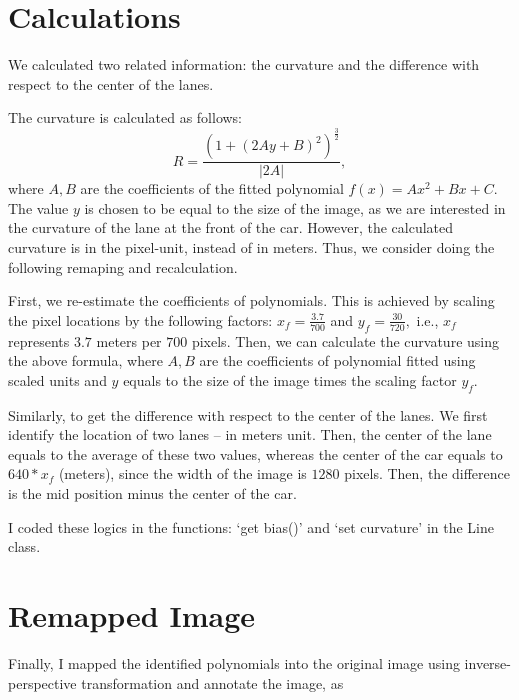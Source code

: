 \documentclass[draftcls,onecolumn,12pt]{IEEEtran}
\theoremstyle{plain}
\theoremstyle{plain}
\begin{document}
\section{Calculations}
We calculated two related information: the curvature and the difference with respect to the center of the lanes.

The curvature is calculated as follows:
\begin{equation}
R = \frac{(1 + (2Ay + B)^2)^{\frac{3}{2}}}{|2A|},
\end{equation}
where $A, B$ are the coefficients of the fitted polynomial $f(x) = Ax^2 + Bx +C.$ The value $y$ is chosen to be equal to the size of the image, as we are interested in the curvature of the lane at the front of the car. However, the calculated curvature is in the pixel-unit, instead of in meters. Thus, we consider doing the following remaping and recalculation.

First, we re-estimate the coefficients of polynomials. This is achieved by scaling the pixel locations by the following factors: $x_f = \frac{3.7}{700}$ and $y_f = \frac{30}{720},$ i.e., $x_f$ represents $3.7$ meters per $700$ pixels. Then, we can calculate the curvature using the above formula, where $A, B$ are the coefficients of polynomial fitted using scaled units and $y$ equals to the size of the image times the scaling factor $y_f.$

Similarly, to get the difference with respect to the center of the lanes. We first identify the location of two lanes -- in meters unit. Then, the center of the lane equals to the average of these two values, whereas the center of the car equals to $640 * x_f$ (meters), since the width of the image is $1280$ pixels. Then, the difference is the mid position minus the center of the car.

I coded these logics in the functions: `get bias()' and `set curvature' in the Line class.

\section{Remapped Image}
Finally, I mapped the identified polynomials into the original image using inverse-perspective transformation and annotate the image, as 
\end{document}
